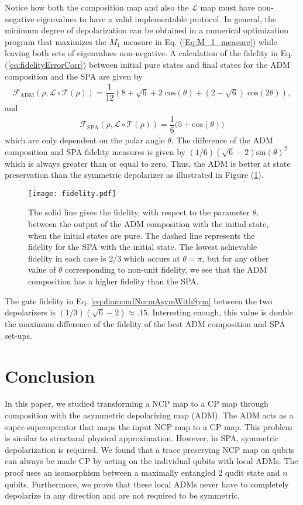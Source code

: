 \documentclass[12pt]{iopart}
\begin{document}
Notice how both the composition map and also the $\mathcal{L}$ map must have non-negative eigenvalues to have a valid implementable protocol. In general, the minimum degree of depolarization can be obtained in a numerical optimization program that maximizes the $M_1$ measure in Eq. (\ref{Eq:M_1_measure}) while leaving both sets of eigenvalues non-negative. A calculation of the fidelity in Eq. (\ref{eq:fidelityErrorCorr}) between initial pure states and final states for the ADM composition and the SPA are given by
\begin{align}
    \mathcal{F}_{\text{ADM}}(\rho, \mathcal{L} \circ \mathcal{T}(\rho)) = \dfrac{1}{12} \left( 8 + \sqrt{6} + 2 \; \text{cos}(\theta) + (2 - \sqrt{6}) \; \text{cos}(2 \theta) \right),
\end{align}
and
\begin{align}
    \mathcal{F}_{\text{SPA}}(\rho, \mathcal{L} \circ \mathcal{T}(\rho))  = \dfrac{1}{6} \bigg( 5 + \text{cos}(\theta) \bigg)
\end{align}
which are only dependent on the polar angle $\theta$. The difference of the ADM composition and SPA fidelity measures is given by $(1/6)(\sqrt{6}-2)\text{sin}(\theta)^2$ which is always greater than or equal to zero. Thus, the ADM is better at state preservation than the symmetric depolarizer as illustrated in Figure (\ref{Fig:Fidelity_NCP_to_CP}).  
\begin{figure}[h!]
    \centering
    \texttt{[image: fidelity.pdf]}
    \caption{The solid line gives the fidelity, with respect to the parameter $\theta$, between the output of the ADM composition with the initial state, when the initial states are pure. The dashed line represents the fidelity for the SPA with the initial state. The lowest achievable fidelity in each case is 2/3 which occurs at $\theta = \pi$, but for any other value of $\theta$ corresponding to non-unit fidelity, we see that the ADM composition has a higher fidelity than the SPA.}
    \label{Fig:Fidelity_NCP_to_CP}
\end{figure}
The gate fidelity in Eq. \eqref{eq:diamondNormAsymWithSym} between the two depolarizers is $(1/3)(\sqrt{6}-2) \approx .15$. Interesting enough, this value is double the maximum difference of the fidelity of the best ADM composition and SPA set-ups. \\



\section{Conclusion}
In this paper, we studied transforming a NCP map to a CP map through composition with the asymmetric depolarizing map (ADM). The ADM acts as a super-superoperator that maps the input NCP map to a CP map. This problem is similar to structural physical approximation. However, in SPA, symmetric depolarization is required. We found that a trace preserving NCP map on qubits can always be made CP by acting on the individual qubits with local ADMs. The proof uses an isomorphism between a maximally entangled $2$ qudit state and $n$ qubits. Furthermore, we prove that these local ADMs never have to completely depolarize in any direction and are not required to be symmetric.
\end{document}
